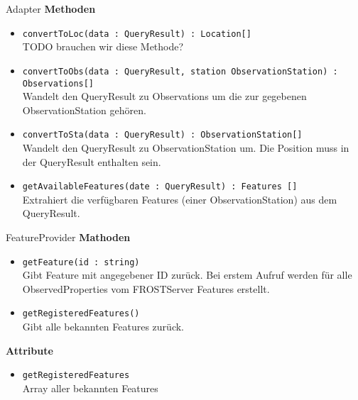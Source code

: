 \begin{class}{Adapter}
    \textbf{Methoden}
    \begin{itemize}
        \item \texttt{convertToLoc(data : QueryResult) : Location[]}
        \\TODO brauchen wir diese Methode?
        \item \texttt{convertToObs(data : QueryResult, station ObservationStation) : Observations[]}
        \\Wandelt den QueryResult zu Observations um die zur gegebenen ObservationStation gehören.
        \item \texttt{convertToSta(data : QueryResult) : ObservationStation[]}
        \\Wandelt den QueryResult zu ObservationStation um. Die Position muss in der QueryResult enthalten sein.
        \item \texttt{getAvailableFeatures(date : QueryResult) : Features []}
        \\Extrahiert die verfügbaren Features (einer ObservationStation) aus dem QueryResult.
    \end{itemize}
\end{class}

\begin{Class}{FeatureProvider}
    \textbf{Mathoden}
    \begin{itemize}
        \item \texttt{getFeature(id : string)}
        \\Gibt Feature mit angegebener ID zurück. Bei erstem Aufruf werden für alle ObservedProperties vom FROSTServer Features erstellt. 
        \item \texttt{getRegisteredFeatures()}
        \\Gibt alle bekannten Features zurück.
    \end{itemize}
    \textbf{Attribute}
    \begin{itemize}
        \item \texttt{getRegisteredFeatures}
        \\Array aller bekannten Features
    \end{itemize}
\end{Class}

